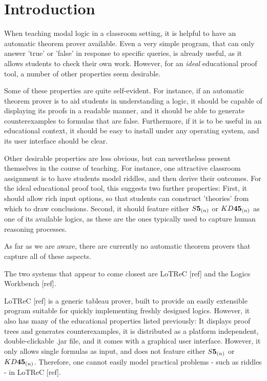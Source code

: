 \section{Introduction}
\label{sec:introduction}

When teaching modal logic in a classroom setting, it is helpful to have an automatic theorem prover available. Even a very simple program, that can only answer 'true' or 'false' in response to specific queries, is already useful, as it allows students to check their own work. However, for an {\it ideal} educational proof tool,  a number of other properties seem desirable.

Some of these properties are quite self-evident. For instance, if an automatic theorem prover is to aid students in understanding a logic, it should be capable of displaying its proofs in a readable manner, and it should be able to generate counterexamples to formulas that are false. Furthermore, if it is to be useful in an educational context, it should be easy to install under any operating system, and its user interface should be clear.

Other desirable properties are less obvious, but can nevertheless present themselves in the course of teaching. For instance, one attractive classroom assignment is to have students model riddles, and then derive their outcomes. For the ideal educational proof tool, this suggests two further properties: First, it should allow rich input options, so that students can construct 'theories' from which to draw conclusions. Second, it should feature either $\mathbf\mathit{S}\textbf{5}_{(n)}$ or $\mathbf\mathit{KD}\textbf{45}_{(n)}$ as one of its available logics, as these are the ones typically used to capture human reasoning processes.

As far as we are aware, there are currently no automatic theorem provers that capture all of these aspects. 

 The two systems that appear to come closest are LoTReC [ref]  and the Logics Workbench [ref]. 

LoTReC [ref] is a generic tableau prover, built to provide an easily extensible program suitable for quickly implementing freshly designed logics. However, it also has many of the educational properties listed previously: It displays proof trees and generates counterexamples, it is distributed as a platform independent, double-clickable .jar file, and it comes with a graphical user interface. However, it only allows single formulas as input, and does not feature either $\mathbf\mathit{S}\textbf{5}_{(n)}$ or $\mathbf\mathit{KD}\textbf{45}_{(n)}$. Therefore, one cannot easily model practical problems - such as riddles - in LoTReC [ref].

